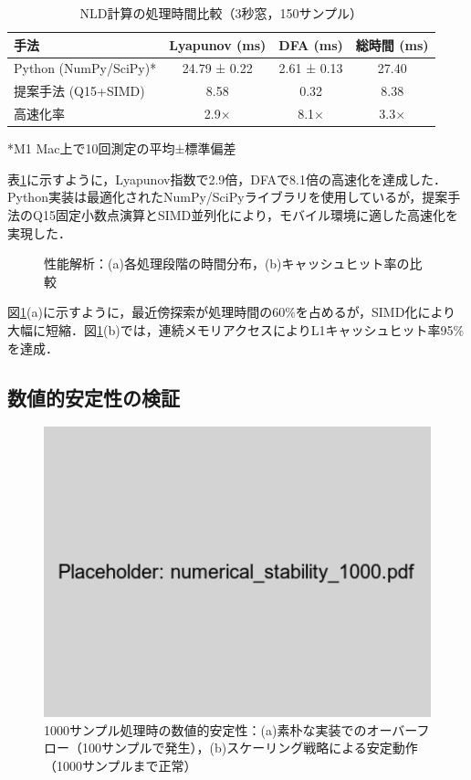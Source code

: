 \documentclass[paper]{ieice}
\begin{document}
\begin{table}[t]
\caption{NLD計算の処理時間比較（3秒窓，150サンプル）}
\label{tab:performance}
\centering
\begin{tabular}{lccc}
\toprule
手法 & Lyapunov (ms) & DFA (ms) & 総時間 (ms) \\
\midrule
Python (NumPy/SciPy)* & 24.79 ± 0.22 & 2.61 ± 0.13 & 27.40 \\
提案手法 (Q15+SIMD) & 8.58 & 0.32 & 8.38 \\
\midrule
高速化率 & 2.9× & 8.1× & 3.3× \\
\bottomrule
\end{tabular}
\vspace{1mm}
\footnotesize{*M1 Mac上で10回測定の平均±標準偏差}
\end{table}

表\ref{tab:performance}に示すように，Lyapunov指数で2.9倍，DFAで8.1倍の高速化を達成した．Python実装は最適化されたNumPy/SciPyライブラリを使用しているが，提案手法のQ15固定小数点演算とSIMD並列化により，モバイル環境に適した高速化を実現した．

\begin{figure}[t]
\centering
{}
\caption{性能解析：(a)各処理段階の時間分布，(b)キャッシュヒット率の比較}
\label{fig:performance_analysis}
\end{figure}

図\ref{fig:performance_analysis}(a)に示すように，最近傍探索が処理時間の60\%を占めるが，SIMD化により大幅に短縮．図\ref{fig:performance_analysis}(b)では，連続メモリアクセスによりL1キャッシュヒット率95\%を達成．

\subsection{数値的安定性の検証}

\begin{figure}[t]
\centering
\includegraphics[width=0.85\linewidth]{numerical_stability_1000.pdf}
\caption{1000サンプル処理時の数値的安定性：(a)素朴な実装でのオーバーフロー（100サンプルで発生），(b)スケーリング戦略による安定動作（1000サンプルまで正常）}
\label{fig:stability}
\end{figure}
\end{document}
